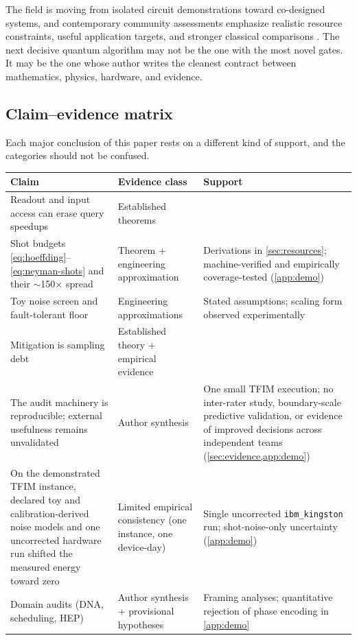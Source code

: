 The field is moving from isolated circuit demonstrations toward co-designed systems, and contemporary community assessments emphasize realistic resource constraints, useful application targets, and stronger classical comparisons \citep{nqiworkshop2025}. The next decisive quantum algorithm may not be the one with the most novel gates. It may be the one whose author writes the cleanest contract between mathematics, physics, hardware, and evidence.

\subsection{Claim--evidence matrix}

Each major conclusion of this paper rests on a different kind of support, and the categories should not be confused.

\begin{center}
\small
\begin{tabular}{p{}p{}p{}}
\toprule
\textbf{Claim} & \textbf{Evidence class} & \textbf{Support} \\
\midrule
Readout and input access can erase query speedups & Established theorems & \citep{harrow2009,aaronson2015,tang2019} \\
Shot budgets \eqref{eq:hoeffding}--\eqref{eq:neyman-shots} and their $\sim$150$\times$ spread & Theorem + engineering approximation & Derivations in \cref{sec:resources}; machine-verified and empirically coverage-tested (\cref{app:demo}) \\
Toy noise screen and fault-tolerant floor & Engineering approximations & Stated assumptions; scaling form observed experimentally \citep{acharya2025} \\
Mitigation is sampling debt & Established theory + empirical evidence & \citep{cai2023,quek2024} \\
The audit machinery is reproducible; external usefulness remains unvalidated & Author synthesis & One small TFIM execution; no inter-rater study, boundary-scale predictive validation, or evidence of improved decisions across independent teams (\cref{sec:evidence,app:demo}) \\
On the demonstrated TFIM instance, declared toy and calibration-derived noise models and one uncorrected hardware run shifted the measured energy toward zero & Limited empirical consistency (one instance, one device-day) & Single uncorrected \texttt{ibm\_kingston} run; shot-noise-only uncertainty (\cref{app:demo}) \\
Domain audits (DNA, scheduling, HEP) & Author synthesis + provisional hypotheses & Framing analyses; quantitative rejection of phase encoding in \cref{app:demo} \\
\bottomrule
\end{tabular}
\label{tab:claim-evidence}
\end{center}

